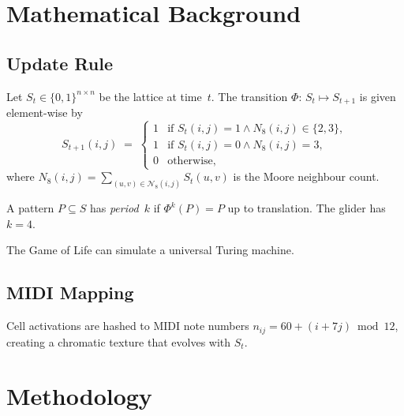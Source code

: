 \documentclass{report}
\begin{document}
\chapter{Mathematical Background}
\section{Update Rule}
Let \(S_t\in\{0,1\}^{n\times n}\) be the lattice at time~\(t\).  The transition
\(\Phi:\,S_t\mapsto S_{t+1}\) is given element-wise by
\begin{equation}
  S_{t+1}(i,j) \;=\;
  \begin{cases}
    1 &\text{if } S_t(i,j)=1 \wedge N_8(i,j)\in\{2,3\},\\
    1 &\text{if } S_t(i,j)=0 \wedge N_8(i,j)=3,\\
    0 &\text{otherwise},
  \end{cases}
  \label{eq:gol}
\end{equation}
where \(N_8(i,j)=\sum_{(u,v)\in\mathcal N_8(i,j)}S_t(u,v)\) is the Moore
neighbour count.

\begin{definition}
A pattern \(P\subseteq S\) has \emph{period~\(k\)} if \(\Phi^k(P)=P\) up to
translation.  The glider has \(k=4\).
\end{definition}

\begin{theorem}
The Game of Life can simulate a universal Turing machine.
\end{theorem}

\section{MIDI Mapping}
Cell activations are hashed to MIDI note numbers
\(
  n_{ij} = 60 + (i + 7j)\bmod 12
\),
creating a chromatic texture that evolves with \(S_t\).

\chapter{Methodology}
\end{document}
